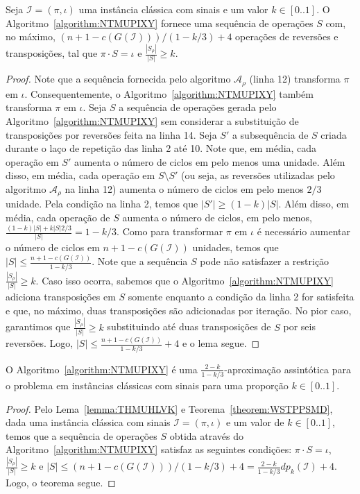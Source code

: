 \begin{lemma}\label{lemma:THMUHLVK}
Seja $\mathcal{I} = (\pi,\iota)$ uma instância clássica com sinais e um valor $k \in [0..1]$. O Algoritmo~\ref{algorithm:NTMUPIXY} fornece uma sequência de operações $S$ com, no máximo, $(n+1-c(G(\mathcal{I}))) / (1-k/3) + 4$ operações de reversões e transposições, tal que $\pi \cdot S = \iota$ e $\frac{|S_{\rho}|}{|S|} \ge k$. 
\end{lemma}
\begin{proof}
Note que a sequência fornecida pelo algoritmo $\mathcal{A}_\rho$ (linha 12) transforma $\pi$ em $\iota$. Consequentemente, o Algoritmo~\ref{algorithm:NTMUPIXY} também transforma $\pi$ em $\iota$.
Seja $S$ a sequência de operações gerada pelo Algoritmo~\ref{algorithm:NTMUPIXY} sem considerar a substituição de transposições por reversões feita na linha 14. Seja $S'$ a subsequência de $S$ criada durante o laço de repetição das linha 2 até 10. Note que, em média, cada operação em $S'$ aumenta o número de ciclos em pelo menos uma unidade. Além disso, em média, cada operação em $S \setminus S'$ (ou seja, as reversões utilizadas pelo algoritmo $\mathcal{A}_\rho$ na linha 12) aumenta o número de ciclos em pelo menos $2/3$ unidade. Pela condição na linha 2, temos que $|S'| \ge (1-k) |S|$. Além disso, em média, cada operação de $S$ aumenta o número de ciclos, em pelo menos, $\frac{(1-k)|S| + k|S|2/3}{|S|} = 1 - k/3$. Como para transformar $\pi$ em $\iota$ é necessário aumentar o número de ciclos em $n+1-c(G(\mathcal{I}))$ unidades, temos que $|S| \le \frac{n+1-c(G(\mathcal{I}))}{1-k/3}$. Note que a sequência $S$ pode não satisfazer a restrição $\frac{|S_{\rho}|}{|S|} \ge k$. Caso isso ocorra, sabemos que o Algoritmo~\ref{algorithm:NTMUPIXY} adiciona transposições em $S$ somente enquanto a condição da linha 2 for satisfeita e que, no máximo, duas transposições são adicionadas por iteração. No pior caso, garantimos que $\frac{|S_{\rho}|}{|S|} \ge k$ substituindo até duas transposições de $S$ por seis reversões. Logo, $|S| \le \frac{n+1-c(G(\mathcal{I}))}{1-k/3} + 4$ e o lema segue.
\end{proof}

\begin{theorem}\label{theorem:VWZUZNOR}
O Algoritmo~\ref{algorithm:NTMUPIXY} é uma $\frac{2-k}{1-k/3}$-aproximação assintótica para o problema \SbPRT{} em instâncias clássicas com sinais para uma proporção $k \in [0..1]$.
\end{theorem}
\begin{proof}
Pelo Lema~\ref{lemma:THMUHLVK} e Teorema~\ref{theorem:WSTPPSMD}, dada uma instância clássica com sinais $\mathcal{I} = (\pi,\iota)$ e um valor de $k \in [0..1]$, temos que a sequência de operações $S$ obtida através do Algoritmo~\ref{algorithm:NTMUPIXY} satisfaz as seguintes condições: $\pi \cdot S = \iota$, $\frac{|S_{\rho}|}{|S|} \ge k$ e $|S| \le (n+1-c(G(\mathcal{I}))) / (1-k/3) + 4 = \frac{2-k}{1-k/3} dp_k(\mathcal{I}) + 4$. Logo, o teorema segue.
\end{proof}

